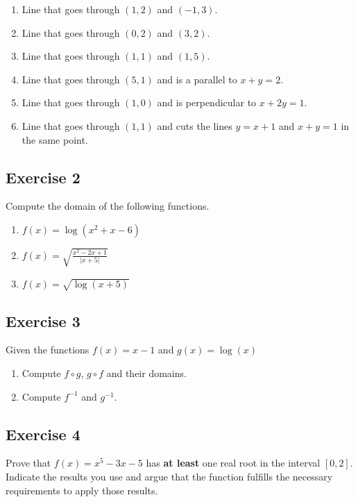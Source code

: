 \documentclass[11pt]{article}
\providecommand{\tightlist}{%
      \setlength{\itemsep}{0pt}\setlength{\parskip}{0pt}}
\begin{document}
\begin{enumerate}
\def\labelenumi{\arabic{enumi}.}
\tightlist
\item
  Line that goes through \((1,2)\) and \((-1,3)\).
\item
  Line that goes through \((0,2)\) and \((3,2)\).
\item
  Line that goes through \((1,1)\) and \((1,5)\).
\item
  Line that goes through \((5,1)\) and is a parallel to \(x + y = 2\).
\item
  Line that goes through \((1,0)\) and is perpendicular to
  \(x + 2y = 1\).
\item
  Line that goes through \((1,1)\) and cuts the lines \(y = x + 1\) and
  \(x + y = 1\) in the same point.
\end{enumerate}

\hypertarget{exercise-2}{%
\subsection{Exercise 2}\label{exercise-2}}

Compute the domain of the following functions.

\begin{enumerate}
\def\labelenumi{\arabic{enumi}.}
\tightlist
\item
  \(f(x) = \log(x^2 + x - 6)\)
\item
  \(f(x) = \sqrt{\frac{x^2-2x + 1}{\lvert x + 5 \rvert}}\)
\item
  \(f(x) = \sqrt{\log(x + 5)}\)
\end{enumerate}

\hypertarget{exercise-3}{%
\subsection{Exercise 3}\label{exercise-3}}

Given the functions \(f(x) = x - 1\) and \(g(x) = \log(x)\)

\begin{enumerate}
\def\labelenumi{\arabic{enumi}.}
\tightlist
\item
  Compute \(f\circ g\), \(g\circ f\) and their domains.
\item
  Compute \(f^{-1}\) and \(g^{-1}\).
\end{enumerate}

\hypertarget{exercise-4}{%
\subsection{Exercise 4}\label{exercise-4}}

Prove that \(f(x) = x^5 - 3x - 5\) has \textbf{at least} one real root
in the interval \([0, 2]\). Indicate the results you use and argue that
the function fulfills the necessary requirements to apply those results.


    
    
    
    
\end{document}

